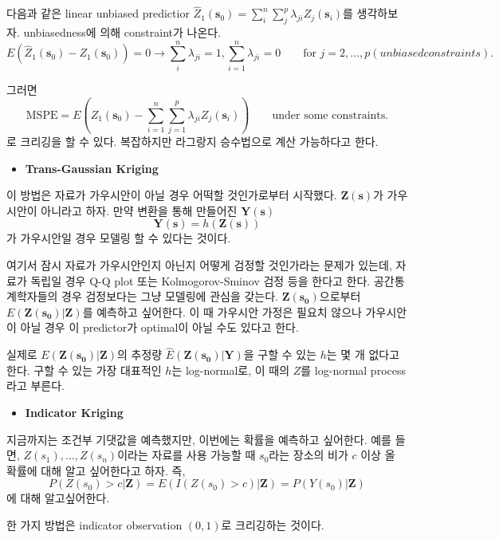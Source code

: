 \documentclass[b5paper,]{book}
\providecommand{\tightlist}{%
  \setlength{\itemsep}{0pt}\setlength{\parskip}{0pt}}
\theoremstyle{definition}
\theoremstyle{definition}
\theoremstyle{definition}
\theoremstyle{remark}
\begin{document}
다음과 같은 linear unbiased predictior
\(\hat{Z}_{1}(\mathbf{s}_{0})=\sum_{i}^{n}\sum_{j}^{p}\lambda_{ji}Z_{j}(\mathbf{s}_{i})\)를
생각하보자. unbiasedness에 의해 constraint가 나온다.
\[E(\hat{Z}_{1}(\mathbf{s}_{0})-Z_{1}(\mathbf{s}_{0}))=0 \rightarrow \sum_{i}^{n}\lambda_{ji}=1, \sum_{i=1}^{n}\lambda_{ji}=0 \qquad \text{for } j=2,\ldots, p (unbiased constraints).\]

그러면
\[\text{MSPE}=E(Z_{1}(\mathbf{s}_{0})-\sum_{i=1}^{n}\sum_{j=1}^{p}\lambda_{ji}Z_{j}(\mathbf{s}_{i})) \qquad{\text{under some constraints.}}\]
로 크리깅을 할 수 있다. 복잡하지만 라그랑지 승수법으로 계산 가능하다고
한다.

\begin{itemize}
\tightlist
\item
  \textbf{Trans-Gaussian Kriging}
\end{itemize}

이 방법은 자료가 가우시안이 아닐 경우 어떡할 것인가로부터 시작했다.
\(\mathbf{Z}(\mathbf{s})\)가 가우시안이 아니라고 하자. 만약 변환을 통해
만들어진 \(\mathbf{Y}(\mathbf{s})\)
\[\mathbf{Y}(\mathbf{s})=h(\mathbf{Z}(\mathbf{s}))\] 가 가우시안일 경우
모델링 할 수 있다는 것이다.

여기서 잠시 자료가 가우시안인지 아닌지 어떻게 검정할 것인가라는 문제가
있는데, 자료가 독립일 경우 Q-Q plot 또는 Kolmogorov-Sminov 검정 등을
한다고 한다. 공간통계학자들의 경우 검정보다는 그냥 모델링에 관심을
갖는다. \(\mathbf{Z}(\mathbf{s_{0}})\)으로부터
\(E(\mathbf{Z}(\mathbf{s_{0}})|\mathbf{Z})\)를 예측하고 싶어한다. 이 때
가우시안 가정은 필요치 않으나 가우시안이 아닐 경우 이 predictor가
optimal이 아닐 수도 있다고 한다.

실제로 \(E(\mathbf{Z}(\mathbf{s_{0}})|\mathbf{Z})\)의 추정량
\(\hat{E}(\mathbf{Z}(\mathbf{s_{0}})|\mathbf{Y})\)을 구할 수 있는
\(h\)는 몇 개 없다고 한다. 구할 수 있는 가장 대표적인 \(h\)는
log-normal로, 이 때의 \(Z\)를 log-normal process라고 부른다.

\begin{itemize}
\tightlist
\item
  \textbf{Indicator Kriging}
\end{itemize}

지금까지는 조건부 기댓값을 예측했지만, 이번에는 확률을 예측하고
싶어한다. 예를 들면, \(Z(s_{1}), \ldots , Z(s_{n})\)이라는 자료를 사용
가능할 때 \(s_{0}\)라는 장소의 비가 \(c\) 이상 올 확률에 대해 알고
싶어한다고 하자. 즉,
\[P(Z(s_{0})>c |\mathbf{Z})=E(I(Z(s_{0})>c)|\mathbf{Z})=P(Y(s_{0})|\mathbf{Z})\]
에 대해 알고싶어한다.

한 가지 방법은 indicator observation \((0,1)\)로 크리깅하는 것이다.
\end{document}
